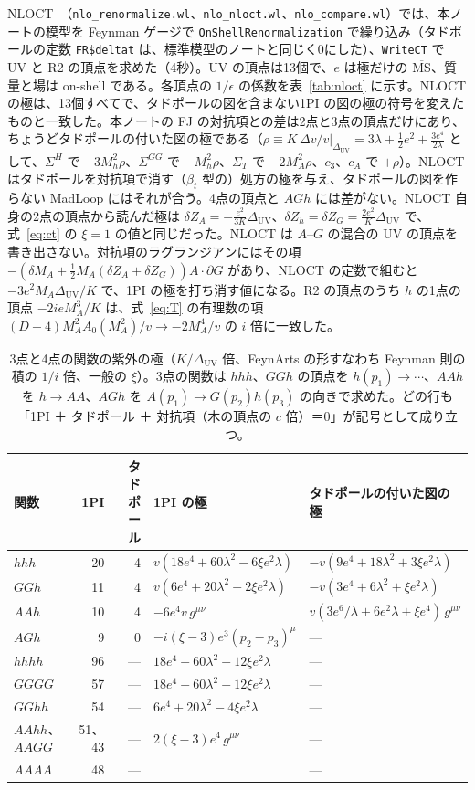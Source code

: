 \documentclass[a4paper,10pt]{ltjsarticle}
\newcommand{\MSbar}{\overline{\mathrm{MS}}}
\newcommand{\DUV}{\Delta_{\mathrm{UV}}}
\begin{document}
NLOCT~\cite{nloct}（\texttt{nlo\_renormalize.wl}、\texttt{nlo\_nloct.wl}、\texttt{nlo\_compare.wl}）では、本ノートの模型を Feynman ゲージで \texttt{OnShellRenormalization} で繰り込み（タドポールの定数 \texttt{FR\$deltat} は、標準模型のノートと同じく0にした）、\texttt{WriteCT} で UV と R2 の頂点を求めた（4秒）。UV の頂点は13個で、$e$ は極だけの $\MSbar$、質量と場は on-shell である。各頂点の $1/\epsilon$ の係数を表~\ref{tab:nloct} に示す。NLOCT の極は、13個すべてで、タドポールの図を含まない1PI の図の極の符号を変えたものと一致した。本ノートの FJ の対抗項との差は2点と3点の頂点だけにあり、ちょうどタドポールの付いた図の極である（$\rho\equiv K\,\Delta v/v|_{\DUV}=3\lambda+\frac12e^2+\frac{3e^4}{2\lambda}$ として、$\Sigma^H$ で $-3M_h^2\rho$、$\Sigma^{GG}$ で $-M_h^2\rho$、$\Sigma_T$ で $-2M_A^2\rho$、$c_3$、$c_A$ で $+\rho$）。NLOCT はタドポールを対抗項で消す（$\beta_t$ 型の）処方の極を与え、タドポールの図を作らない MadLoop にはそれが合う。4点の頂点と $AGh$ には差がない。NLOCT 自身の2点の頂点から読んだ極は $\delta Z_A=-\frac{e^2}{3K}\DUV$、$\delta Z_h=\delta Z_G=\frac{2e^2}K\DUV$ で、式~\eqref{eq:ct} の $\xi=1$ の値と同じだった。NLOCT は $A$--$G$ の混合の UV の頂点を書き出さない。対抗項のラグランジアンにはその項 $-(\delta M_A+\frac12M_A(\delta Z_A+\delta Z_G))A\cdot\partial G$ があり、NLOCT の定数で組むと $-3e^2M_A\DUV/K$ で、1PI の極を打ち消す値になる。R2 の頂点のうち $h$ の1点の頂点 $-2ieM_A^3/K$ は、式~\eqref{eq:T} の有理数の項 $(D-4)M_A^2A_0(M_A^2)/v\to-2M_A^4/v$ の $i$ 倍に一致した。

\begin{table}[tbp]
\centering\small
\caption{3点と4点の関数の紫外の極（$K/\DUV$ 倍、FeynArts の形すなわち Feynman 則の積の $1/i$ 倍、一般の $\xi$）。3点の関数は $hhh$、$GGh$ の頂点を $h(p_1)\to\cdots$、$AAh$ を $h\to AA$、$AGh$ を $A(p_1)\to G(p_2)h(p_3)$ の向きで求めた。どの行も「1PI ＋ タドポール ＋ 対抗項（木の頂点の $c$ 倍）＝0」が記号として成り立つ。}
\label{tab:vertex}
\begin{tabularx}{\linewidth}{lrr>{\raggedright\arraybackslash}X>{\raggedright\arraybackslash}X}
\toprule
関数 & 1PI & タドポール & 1PI の極 & タドポールの付いた図の極 \\
\midrule
$hhh$ & 20 & 4 & $v(18e^4+60\lambda^2-6\xi e^2\lambda)$ & $-v(9e^4+18\lambda^2+3\xi e^2\lambda)$ \\
$GGh$ & 11 & 4 & $v(6e^4+20\lambda^2-2\xi e^2\lambda)$ & $-v(3e^4+6\lambda^2+\xi e^2\lambda)$ \\
$AAh$ & 10 & 4 & $-6e^4v\,g^{\mu\nu}$ & $v(3e^6/\lambda+6e^2\lambda+\xi e^4)\,g^{\mu\nu}$ \\
$AGh$ & 9 & 0 & $-i(\xi-3)e^3(p_2-p_3)^\mu$ & — \\
$hhhh$ & 96 & — & $18e^4+60\lambda^2-12\xi e^2\lambda$ & — \\
$GGGG$ & 57 & — & $18e^4+60\lambda^2-12\xi e^2\lambda$ & — \\
$GGhh$ & 54 & — & $6e^4+20\lambda^2-4\xi e^2\lambda$ & — \\
$AAhh$、$AAGG$ & 51、43 & — & $2(\xi-3)e^4\,g^{\mu\nu}$ & — \\
$AAAA$ & 48 & — & 0 & — \\
\bottomrule
\end{tabularx}
\end{table}
\end{document}
